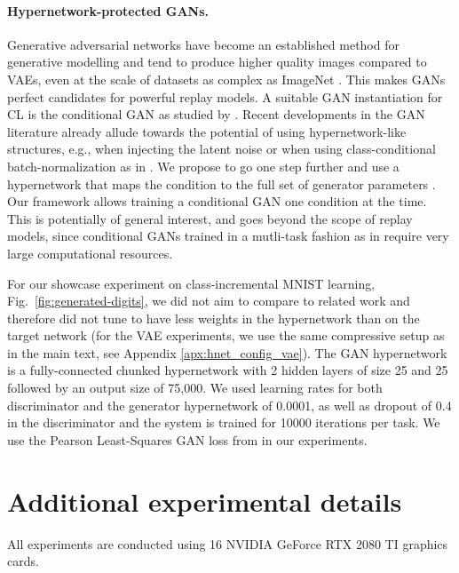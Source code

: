 \documentclass{article}
\begin{document}
\paragraph{Hypernetwork-protected GANs.} \label{apx:hnet_config_gan} Generative adversarial networks \citep{goodfellow2014generative} have become an established method for generative modelling and tend to produce higher quality images compared to VAEs, even at the scale of datasets as complex as ImageNet \citep{biggan, semi:supervised:cgan:imagenet, unsupervised:gan:imagenet}. This makes GANs perfect candidates for powerful replay models. A suitable GAN instantiation for CL is the conditional GAN \citep{conditional:gan} as studied by \citet{wu_memory_2018}. Recent developments in the GAN literature already allude towards the potential of using hypernetwork-like structures, e.g., when injecting the latent noise \citep{karras2019style} or when using class-conditional batch-normalization as in \citep{biggan}. We propose to go one step further and use a hypernetwork that maps the condition to the full set of generator parameters . Our framework allows training a conditional GAN one condition at the time. This is potentially of general interest, and goes beyond the scope of replay models, since conditional GANs trained in a mutli-task fashion as in \cite{biggan} require very large computational resources. 

For our showcase experiment on class-incremental MNIST learning, Fig.~\ref{fig:generated-digits}, we did not aim to compare to related work and therefore did not tune 
to have less weights in the hypernetwork than on the target network (for the VAE experiments, we use the same compressive setup as in the main text, see Appendix \ref{apx:hnet_config_vae}). The GAN hypernetwork is a fully-connected chunked hypernetwork with 2 hidden layers of size 25 and 25 followed by an output size of 75,000. We used learning rates for both discriminator and the generator hypernetwork of 0.0001, as well as dropout of 0.4 in the discriminator and the system is trained for 10000 iterations per task. 
We use the Pearson  Least-Squares GAN loss from \citet{lsgan} in our experiments.


\section{Additional experimental details}
\label{apx:extra-details}

All experiments are conducted using 16 NVIDIA GeForce RTX 2080 TI graphics cards.
\end{document}
